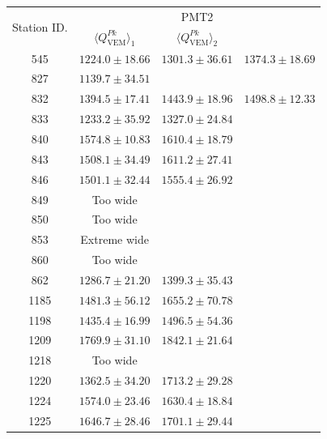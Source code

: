 \documentclass[aspectratio=169]{beamer}
\begin{document}
\begin{frame}
  \footnotesize
  \begin{tabular}{c|c|c|c} \hline
    \multirow{2}{*}{Station ID.} & \multicolumn{3}{c}{PMT2} \\
    \cline{2-4}
     & $\langle Q^{Pk}_{\mathrm{VEM}} \rangle_1$ & 
     $\langle Q^{Pk}_{\mathrm{VEM}} \rangle_2$ &  \\
     \cline{1-4}
     545  & $1224.0\pm18.66$ & $1301.3\pm36.61$ 
     & $1374.3\pm18.69$ 
     \\ \hline
     827  & $1139.7\pm34.51$ & &  
     \\ \hline
     832  & $1394.5\pm17.41$ & $1443.9\pm18.96$ &
     $1498.8\pm12.33$
     \\ \hline
     833  & $1233.2\pm35.92$ & $1327.0\pm24.84$ &
     \\ \hline
     840  & $1574.8\pm10.83$ & $1610.4\pm18.79$ &
     \\ \hline
     843  & $1508.1\pm34.49$ & $1611.2\pm27.41$ &
     \\ \hline
     846  & $1501.1\pm32.44$ & $1555.4\pm26.92$ &
     \\ \hline
     849  & Too wide & & 
     \\ \hline
     850  & Too wide & & 
     \\ \hline
     853  & Extreme wide & & 
     \\ \hline
     860  & Too wide & & 
     \\ \hline
     862  & $1286.7\pm21.20$ & $1399.3\pm35.43$ &
     \\ \hline
     1185 & $1481.3\pm56.12$ & $1655.2\pm70.78$ &
     \\ \hline
     1198 & $1435.4\pm16.99$ & $1496.5\pm54.36$ &
     \\ \hline
     1209 & $1769.9\pm31.10$ & $1842.1\pm21.64$ & 
     \\ \hline
     1218 & Too wide & & 
     \\ \hline
     1220 & $1362.5\pm34.20$ & $1713.2\pm29.28$ & 
     \\ \hline
     1224 & $1574.0\pm23.46$ & $1630.4\pm18.84$ & 
     \\ \hline
     1225 & $1646.7\pm28.46$ & $1701.1\pm29.44$ &
     \\ \hline
  \end{tabular}
\end{frame}
\end{document}
